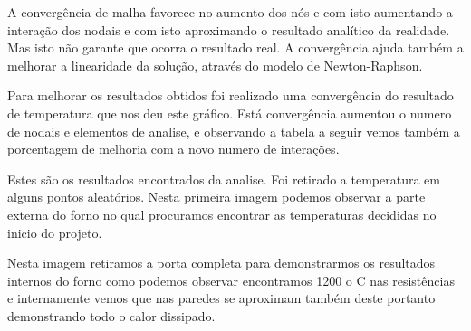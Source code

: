 A convergência de malha favorece no aumento dos nós e com isto aumentando a interação
dos nodais e com isto aproximando o resultado analítico da realidade. Mas isto não garante que
ocorra o resultado real. A convergência ajuda também a melhorar a linearidade da solução, através
do modelo de Newton-Raphson.

Para melhorar os resultados obtidos foi realizado uma convergência do resultado de
temperatura que nos deu este gráfico. Está convergência aumentou o numero de nodais e
elementos de analise, e observando a tabela a seguir vemos também a porcentagem de melhoria
com a novo numero de interações.


Estes são os resultados encontrados da analise. Foi retirado a temperatura em alguns pontos
aleatórios. Nesta primeira imagem podemos observar a parte externa do forno no qual procuramos
encontrar as temperaturas decididas no inicio do projeto.


Nesta imagem retiramos a porta completa para demonstrarmos os resultados internos do
forno como podemos observar encontramos 1200 o C nas resistências e internamente vemos que nas
paredes se aproximam também deste portanto demonstrando todo o calor dissipado.


